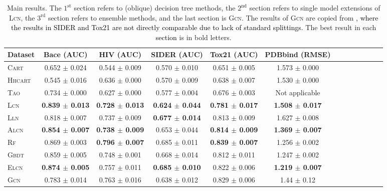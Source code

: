 \documentclass{article} \usepackage{iclr2020_conference,times}
\newcommand{\camera}[1]{\textcolor{black}{#1}}
\begin{document}
\begin{table}
  \caption{Main results. The $1^\text{st}$ section refers to (oblique) decision tree methods, the $2^\text{nd}$ section refers to single model extensions of \textsc{Lcn}, the $3^\text{rd}$ section refers to ensemble methods, and the last section is \textsc{Gcn}. The results of \textsc{Gcn} are copied from \citep{wu2018moleculenet}\camera{, where the results in SIDER and Tox21 are not directly comparable due to lack of standard splittings.} The best result in each \camera{section} is in bold letters.}\label{tab:main}
  \centering
  \begin{tabular}{lcccccccccccc}
    \toprule
    \small Dataset      & \small {Bace (AUC)} & \small {HIV (AUC)} & \small {SIDER (AUC)} & \small {Tox21 (AUC)} & \small {PDBbind (RMSE)}\\
    \midrule
    \textsc{Cart}       & \small 0.652 $\pm$ 0.024 & \small 0.544 $\pm$ 0.009 & \small 0.570 $\pm$ 0.010 & \small 0.651 $\pm$ 0.005 & \small 1.573 $\pm$ 0.000\\
    \textsc{Hhcart}     & \small 0.545 $\pm$ 0.016 & \small 0.636 $\pm$ 0.000 & \small 0.570 $\pm$ 0.009 & \small 0.638 $\pm$ 0.007 & \small 1.530 $\pm$ 0.000\\
    \textsc{Tao}        & \small 0.734 $\pm$ 0.000 & \small 0.627 $\pm$ 0.000 & \small 0.577 $\pm$ 0.004 & \small 0.676 $\pm$ 0.003 & \small Not applicable\\
    \textsc{Lcn}        & \small \bf 0.839 $\pm$ 0.013 & \small \bf 0.728 $\pm$ 0.013 & \small \bf 0.624 $\pm$ 0.044 & \small \bf 0.781 $\pm$ 0.017 & \small \bf 1.508 $\pm$ 0.017\\
    \midrule
    {\textsc{Lln}}      & \small 0.818 $\pm$ 0.007 & \small 0.737 $\pm$ 0.009 & \small \bf 0.677 $\pm$ 0.014 & \small 0.813 $\pm$ 0.009 & \small 1.627 $\pm$ 0.008\\
    \textsc{Alcn}       & \small \bf 0.854 $\pm$ 0.007 & \small \bf 0.738 $\pm$ 0.009 & \small 0.653 $\pm$ 0.044 & \small \bf 0.814 $\pm$ 0.009 & \small \bf 1.369 $\pm$ 0.007\\
    \midrule
    \textsc{Rf}         & \small 0.869 $\pm$ 0.003 & \small \bf 0.796 $\pm$ 0.007 & \small 0.685 $\pm$ 0.011 & \small \bf 0.839 $\pm$ 0.007 & \small 1.256 $\pm$ 0.002\\
    \textsc{Gbdt}       & \small 0.859 $\pm$ 0.005 & \small 0.748 $\pm$ 0.001 & \small 0.668 $\pm$ 0.014 & \small 0.812 $\pm$ 0.011 & \small 1.247 $\pm$ 0.002\\
    \textsc{Elcn}     & \small \bf 0.874 $\pm$ 0.005 & \small 0.757 $\pm$ 0.011 & \small \bf 0.685 $\pm$ 0.010 & \small 0.822 $\pm$ 0.006 & \small \bf {1.219 $\pm$ 0.007} \\
    \midrule
    \textsc{Gcn}        & \small 0.783 $\pm$ 0.014 & \small 0.763 $\pm$ 0.016   & \small *0.638 $\pm$ 0.012 & \small *0.829 $\pm$ 0.006 & \small 1.44 $\pm$ 0.12\\
    \bottomrule
  \end{tabular}
\end{table}
\end{document}
